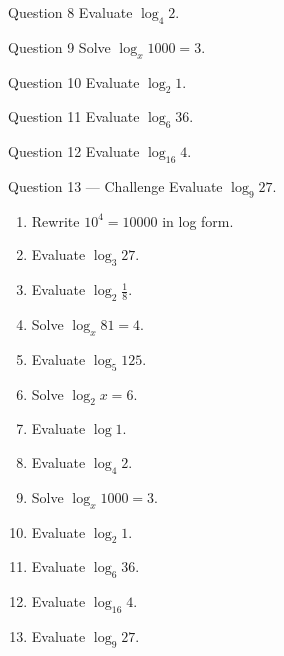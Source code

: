 \documentclass[11pt]{article}
\begin{document}
\begin{qbox}{Question 8}
Evaluate $\log_4 2$.\workspace{2.4cm}
\end{qbox}

\begin{qbox}{Question 9}
Solve $\log_x 1000=3$.\workspace{2.4cm}
\end{qbox}

\begin{qbox}{Question 10}
Evaluate $\log_2 1$.\workspace{2.4cm}
\end{qbox}

\begin{qbox}{Question 11}
Evaluate $\log_6 36$.\workspace{2.4cm}
\end{qbox}

\begin{qbox}{Question 12}
Evaluate $\log_{16} 4$.\workspace{2.4cm}
\end{qbox}

\begin{qbox}{Question 13 --- Challenge}
Evaluate $\log_9 27$.\workspace{3cm}
\end{qbox}

\clearpage
{}

\begin{recapbox}
\begin{multicols}{2}
\small
\begin{enumerate}[leftmargin=*,itemsep=3pt]
  \item Rewrite $10^4=10000$ in log form.
  \item Evaluate $\log_3 27$.
  \item Evaluate $\log_2\tfrac18$.
  \item Solve $\log_x 81=4$.
  \item Evaluate $\log_5 125$.
  \item Solve $\log_2 x=6$.
  \item Evaluate $\log 1$.
  \item Evaluate $\log_4 2$.
  \item Solve $\log_x 1000=3$.
  \item Evaluate $\log_2 1$.
  \item Evaluate $\log_6 36$.
  \item Evaluate $\log_{16} 4$.
  \item Evaluate $\log_9 27$.
\end{enumerate}
\end{multicols}
\end{recapbox}
\end{document}
